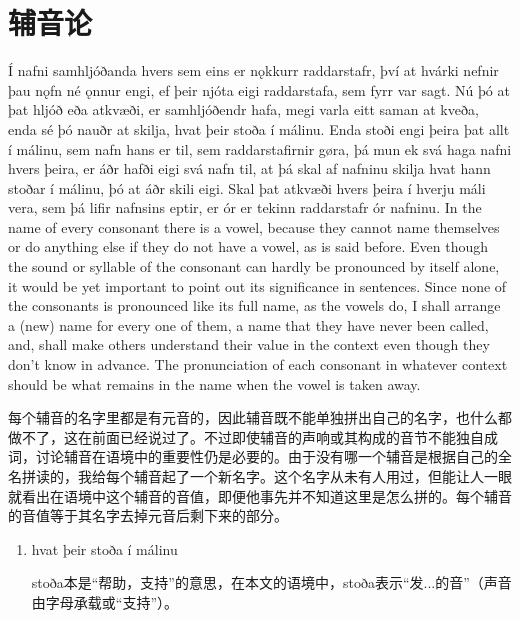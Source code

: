 \section{辅音论}
\begin{paracol}{2}
  Í nafni samhljóðanda hvers sem eins er nǫkkurr raddarstafr, því at hvárki nefnir þau nǫfn né ǫnnur engi, ef þeir njóta eigi raddarstafa, sem fyrr var sagt. Nú þó at þat hljóð eða atkvæði, er samhljóðendr hafa, megi varla eitt saman at kveða, enda sé þó nauðr at skilja, hvat þeir stoða í málinu. Enda stoði engi þeira þat allt í málinu, sem nafn hans er til, sem raddarstafirnir gøra, þá mun ek svá haga nafni hvers þeira, er áðr hafði eigi svá nafn til, at þá skal af nafninu skilja hvat hann stoðar í málinu, þó at áðr skili eigi. Skal þat atkvæði hvers þeira í hverju máli vera, sem þá lifir nafnsins eptir, er ór er tekinn raddarstafr ór nafninu.
  \switchcolumn
  In the name of every consonant there is a vowel, because they cannot name themselves or do anything else if they do not have a vowel, as is said before. Even though the sound or syllable of the consonant can hardly be pronounced by itself alone, it would be yet important to point out its significance in sentences. Since none of the consonants is pronounced like its full name, as the vowels do, I shall arrange a (new) name for every one of them, a name that they have never been called, and, shall make others understand their value in the context even though they don't know in advance. The pronunciation of each consonant in whatever context should be what remains in the name when the vowel is taken away.
\end{paracol}
\begin{translation*}{}
  每个辅音的名字里都是有元音的，因此辅音既不能单独拼出自己的名字，也什么都做不了，这在前面已经说过了。不过即使辅音的声响或其构成的音节不能独自成词，讨论辅音在语境中的重要性仍是必要的。由于没有哪一个辅音是根据自己的全名拼读的，我给每个辅音起了一个新名字。这个名字从未有人用过，但能让人一眼就看出在语境中这个辅音的音值，即便他事先并不知道这里是怎么拼的。每个辅音的音值等于其名字去掉元音后剩下来的部分。
\end{translation*}
\begin{grammar*}{}
  \begin{enumerate}[leftmargin=*]
    \item hvat þeir stoða í málinu

          stoða本是“帮助，支持”的意思，在本文的语境中，stoða表示“发...的音”（声音由字母承载或“支持”）。
  \end{enumerate}
\end{grammar*}
